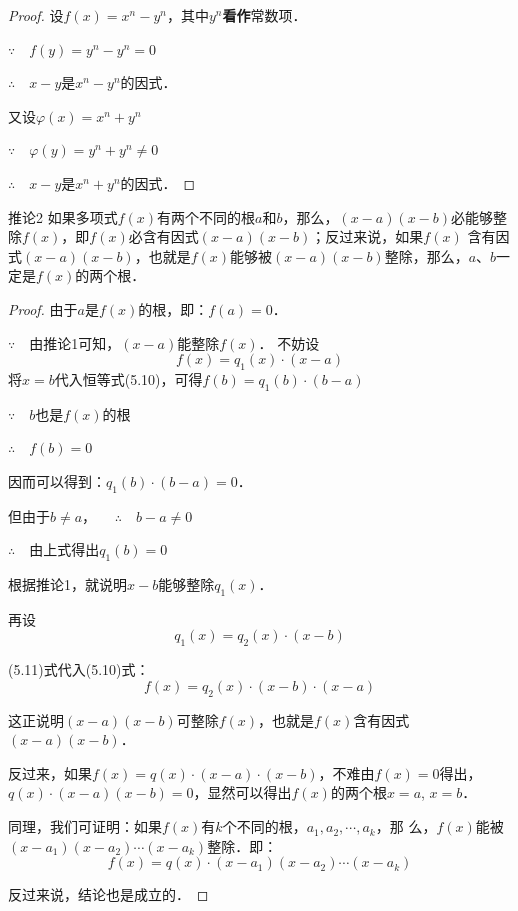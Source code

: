 \begin{proof}
设$f(x)=x^n-y^n$，其中$y^n$\textbf{看作}常数项．

$\because\quad f (y) =y^n -y^n=0$

$\therefore\quad x-y$是$x^n-y^n$的因式．

又设$\varphi(x)=x^n+y^n$

$\because\quad \varphi(y) =y^n +y^n\ne 0$

$\therefore\quad x-y$是$x^n+y^n$的因式．
\end{proof}

\begin{blk}{推论2}
如果多项式$f(x)$有两个不同的根$a$和$b$，那么，$(x-a)(x-b)$必能够整除$f(x)$，即$f(x)$必含有因式$(x-a)(x-b)$；反过来说，如果$f(x)$ 含有因式$(x-a)(x-b)$，也就是$f(x)$能够被$(x-a)(x-b)$整除，那么，$a$、$b$一定是$f(x)$的两个根．
\end{blk}

\begin{proof}
    由于$a$是$f(x)$的根，即：$f(a)=0$．
   
    $\because\quad $由推论1可知，$(x-a)$能整除$f(x)$．
    不妨设
    \begin{equation}
        f(x)=q_1(x)\cdot (x-a)
    \end{equation}
    将$x=b$代入恒等式(5.10)，可得$f (b) =q_1 (b)\cdot (b-a)$

    $\because\quad b$也是$f(x)$的根
    
    $\therefore\quad f(b)=0$
    
    因而可以得到：$q_1(b)\cdot (b-a)=0$．
    
    但由于$b\ne a$，
    $\quad\therefore\quad b-a\ne 0$

    $\therefore\quad$由上式得出$q_1(b)=0$

    根据推论1，就说明$x-b$能够整除$q_1(x)$．
    
    再设
\begin{equation}
    q_1 (x) =q_2 (x) \cdot  (x-b)
\end{equation}
    
(5.11)式代入(5.10)式：
\[f (x) =q_2 (x) \cdot (x-b)\cdot (x-a)\]

这正说明$(x-a)(x-b)$可整除$f(x)$，也就是$f(x)$含有因式$(x-a)(x-b)$．

反过来，如果$f(x)=q(x)\cdot (x-a)·(x-b)$，不难由$f(x)=0$得出，$q(x)\cdot (x-a)(x-b)=0$，显然可以得出$f(x)$的两个根$x=a$, $x=b$．
    
    同理，我们可证明：如果$f(x)$有$k$个不同的根，$a_1,a_2,\cdots,a_k$，那
    么，$f(x)$能被$(x-a_1)(x-a_2)\cdots(x-a_k)$整除．即：
    \[f (x) =q (x) \cdot  (x-a_1) (x-a_2)\cdots (x-a_k)\] 
    
    反过来说，结论也是成立的．

\end{proof}

